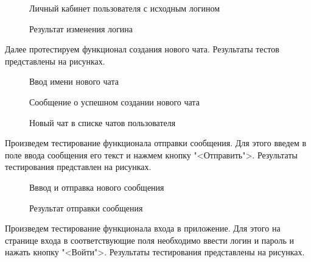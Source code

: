 \begin{figure}[H]
	\caption{Личный кабинет пользователя с исходным логином}
	\label{cabinet_test1:image}
\end{figure}

\begin{figure}[H]
	\caption{Результат изменения логина}
	\label{cabinet_test2:image}
\end{figure}

Далее протестируем функционал создания нового чата. Результаты тестов представлены на рисунках.

\begin{figure}[H]
	\caption{Ввод имени нового чата}
	\label{newChat_test1:image}
\end{figure}

\begin{figure}[H]
	\caption{Сообщение о успешном создании нового чата}
	\label{newChat_test2:image}
\end{figure}

\begin{figure}[H]
	\caption{Новый чат в списке чатов пользователя}
	\label{newChat_test3:image}
\end{figure}

Произведем тестирование функционала отправки сообщения. Для этого введем в поле ввода сообщения его текст и нажмем кнопку "<Отправить">. Результаты тестирования представлен на рисунках.

\begin{figure}[H]
	\caption{Вввод и отправка нового сообщения}
	\label{newmessage_test1:image}
\end{figure}

\begin{figure}[H]
	\caption{Результат отправки сообщения}
	\label{newmessage_test2:image}
\end{figure}

Произведем тестирование функционала входа в приложение. Для этого на странице входа в соответствующие поля необходимо ввести логин и пароль и нажать кнопку "<Войти">. Результаты тестирования представлены на рисунках.

